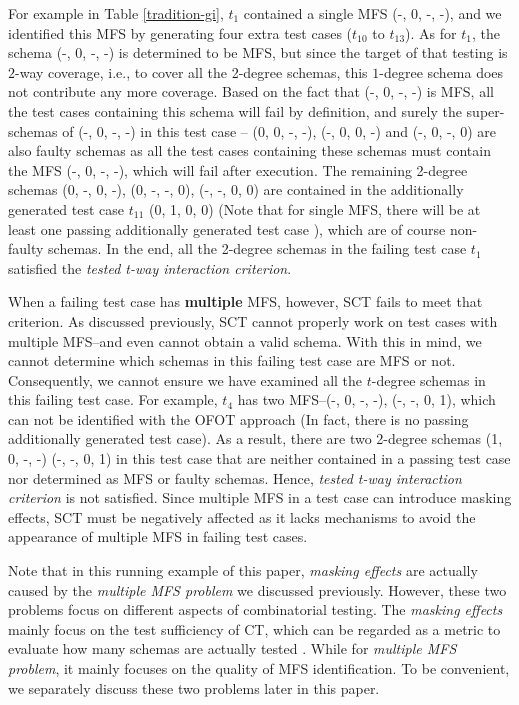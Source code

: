 \documentclass[journal,12pt,onecolumn,draftclsnofoot,]{IEEEtran}
\begin{document}
For example in Table \ref{tradition-gi}, $t_{1}$ contained a single MFS (-, 0, -, -), and we identified this MFS by generating four extra test cases ($t_{10}$ to $t_{13}$). As for $t_{1}$, the schema (-, 0, -, -) is determined to be MFS, but since the target of that testing is $2$-way coverage, i.e., to cover all the 2-degree schemas, this $1$-degree schema does not contribute any more coverage. Based on the fact that (-, 0, -, -) is MFS, all the test cases containing this schema will fail by definition, and surely the super-schemas of (-, 0, -, -) in this test case -- (0, 0, -, -), (-, 0, 0, -) and (-, 0, -, 0) are also faulty schemas as all the test cases containing these schemas must contain the MFS (-, 0, -, -), which will fail after execution. The remaining 2-degree schemas (0, -, 0, -), (0, -, -, 0), (-, -, 0, 0) are contained in the additionally generated test case $t_{11}$ (0, 1, 0, 0) (Note that for single MFS, there will be at least one passing additionally generated test case ), which are of course non-faulty schemas.  In the end, all the 2-degree schemas in the failing test case $t_{1}$ satisfied the \emph{tested t-way interaction criterion}.

When a failing test case has \textbf{multiple} MFS, however, SCT fails to meet that criterion. As discussed previously, SCT cannot properly work on test cases with multiple MFS--and even cannot obtain a valid schema. With this in mind, we cannot determine which schemas in this failing test case are MFS or not. Consequently, we cannot ensure we have examined all the $t$-degree schemas in this failing test case. For example, $t_{4}$ has two MFS--(-, 0, -, -), (-, -, 0, 1), which can not be identified with the OFOT approach (In fact, there is no passing additionally generated test case). As a result, there are two 2-degree schemas (1, 0, -, -) (-, -, 0, 1) in this test case that are neither contained in a passing test case nor determined as MFS or faulty schemas.  Hence, \emph{tested t-way interaction criterion} is not satisfied.  Since multiple MFS in a test case can introduce masking effects, SCT must be negatively affected as it lacks mechanisms to avoid the appearance of multiple MFS in failing test cases.

Note that {\color{red}in this running example of this paper,} \emph{masking effects} are actually caused by the \emph{multiple MFS problem} we discussed previously. However, these two problems focus on different aspects of combinatorial testing. The \emph{masking effects} mainly focus on the test sufficiency of CT, which can be regarded as a metric to evaluate how many schemas are actually tested \cite{yilmaz2013reducing}. While for \emph{multiple MFS problem}, it mainly focuses on the quality of MFS identification. To be convenient, we separately discuss these two problems later in this paper.
\end{document}
